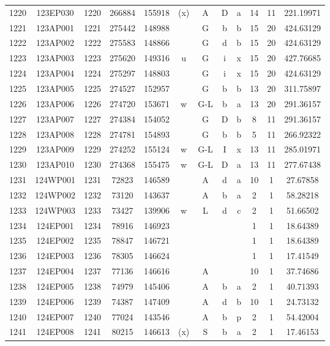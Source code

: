 \begin{tabular}{|*{12}{c|}}
1220 & 123EP030 & 1220 & 266884 & 155918 & (x) & A & D & a & 14 & 11 & 221.19971 \\ 
1221 & 123AP001 & 1221 & 275442 & 148988 &  & G & b & b & 15 & 20 & 424.63129 \\ 
1222 & 123AP002 & 1222 & 275583 & 148866 &  & G & d & b & 15 & 20 & 424.63129 \\ 
1223 & 123AP003 & 1223 & 275620 & 149316 & u & G & i & x & 15 & 20 & 427.76685 \\ 
1224 & 123AP004 & 1224 & 275297 & 148803 &  & G & i & x & 15 & 20 & 424.63129 \\ 
1225 & 123AP005 & 1225 & 274527 & 152957 &  & G & b & b & 13 & 20 & 311.75897 \\ 
1226 & 123AP006 & 1226 & 274720 & 153671 & w & G-L & b & a & 13 & 20 & 291.36157 \\ 
1227 & 123AP007 & 1227 & 274384 & 154052 &  & G & D & b & 8 & 11 & 291.36157 \\ 
1228 & 123AP008 & 1228 & 274781 & 154893 &  & G & b & b & 5 & 11 & 266.92322 \\ 
1229 & 123AP009 & 1229 & 274252 & 155124 & w & G-L & I & x & 13 & 11 & 285.01971 \\ 
1230 & 123AP010 & 1230 & 274368 & 155475 & w & G-L & D & a & 13 & 11 & 277.67438 \\ 
1231 & 124WP001 & 1231 & 72823 & 146589 &  & A & d & a & 10 & 1 & 27.67858 \\ 
1232 & 124WP002 & 1232 & 73120 & 143637 &  & A & b & a & 2 & 1 & 58.28218 \\ 
1233 & 124WP003 & 1233 & 73427 & 139906 & w & L & d & c & 2 & 1 & 51.66502 \\ 
1234 & 124EP001 & 1234 & 78916 & 146923 &  &  &  &  & 1 & 1 & 18.64389 \\ 
1235 & 124EP002 & 1235 & 78847 & 146721 &  &  &  &  & 1 & 1 & 18.64389 \\ 
1236 & 124EP003 & 1236 & 78305 & 146624 &  &  &  &  & 1 & 1 & 17.41549 \\ 
1237 & 124EP004 & 1237 & 77136 & 146616 &  & A &  &  & 10 & 1 & 37.74686 \\ 
1238 & 124EP005 & 1238 & 74979 & 145406 &  & A & b & a & 2 & 1 & 40.71393 \\ 
1239 & 124EP006 & 1239 & 74387 & 147409 &  & A & d & b & 10 & 1 & 24.73132 \\ 
1240 & 124EP007 & 1240 & 77024 & 143546 &  & A & b & p & 2 & 1 & 54.42004 \\ 
1241 & 124EP008 & 1241 & 80215 & 146613 & (x) & S & b & a & 2 & 1 & 17.46153 \\ 

\end{tabular}
